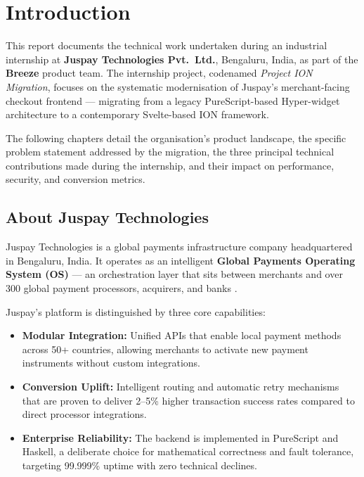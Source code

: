 \chapter{Introduction}\label{Introduction}

This report documents the technical work undertaken during an industrial internship at \textbf{Juspay Technologies Pvt.\ Ltd.}, Bengaluru, India, as part of the \textbf{Breeze} product team. The internship project, codenamed \textit{Project ION Migration}, focuses on the systematic modernisation of Juspay's merchant-facing checkout frontend --- migrating from a legacy PureScript-based Hyper-widget architecture to a contemporary Svelte-based ION framework.

\par The following chapters detail the organisation's product landscape, the specific problem statement addressed by the migration, the three principal technical contributions made during the internship, and their impact on performance, security, and conversion metrics.

\section{About Juspay Technologies}

Juspay Technologies is a global payments infrastructure company headquartered in Bengaluru, India. It operates as an intelligent \textbf{Global Payments Operating System (OS)} --- an orchestration layer that sits between merchants and over 300 global payment processors, acquirers, and banks \cite{juspay_overview}.

\par Juspay's platform is distinguished by three core capabilities:

\begin{itemize}
  \item \textbf{Modular Integration:} Unified APIs that enable local payment methods across 50+ countries, allowing merchants to activate new payment instruments without custom integrations.
  \item \textbf{Conversion Uplift:} Intelligent routing and automatic retry mechanisms that are proven to deliver 2--5\% higher transaction success rates compared to direct processor integrations.
  \item \textbf{Enterprise Reliability:} The backend is implemented in PureScript and Haskell, a deliberate choice for mathematical correctness and fault tolerance, targeting 99.999\% uptime with zero technical declines.
\end{itemize}

